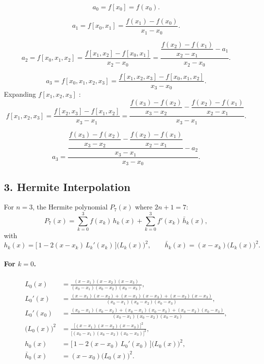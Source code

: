 \documentclass[12pt,a4paper]{article}
\begin{document}
\[
  a_0 = f[x_0] = f(x_0).
\]

\[
  a_1 = f[x_0, x_1] = \frac{f(x_1) - f(x_0)}{x_1 - x_0}.
\]

\[
  a_2 = f[x_0, x_1, x_2]
      = \frac{f[x_1, x_2] - f[x_0, x_1]}{x_2 - x_0}
      = \frac{\dfrac{f(x_2) - f(x_1)}{x_2 - x_1} - a_1}{x_2 - x_0}.
\]

\[
  a_3 = f[x_0, x_1, x_2, x_3]
      = \frac{f[x_1, x_2, x_3] - f[x_0, x_1, x_2]}{x_3 - x_0}.
\]
Expanding $f[x_1, x_2, x_3]$ :
\[
  f[x_1, x_2, x_3]
  = \frac{f[x_2, x_3] - f[x_1, x_2]}{x_3 - x_1}
  = \frac{\dfrac{f(x_3) - f(x_2)}{x_3 - x_2} - \dfrac{f(x_2) - f(x_1)}{x_2 - x_1}}{x_3 - x_1}.
\]

\[
  a_3 = \frac{\dfrac{\dfrac{f(x_3) - f(x_2)}{x_3 - x_2} - \dfrac{f(x_2) - f(x_1)}{x_2 - x_1}}{x_3 - x_1} - a_2}{x_3 - x_0}.
\]

\subsection*{3. Hermite Interpolation}
For $n = 3$, the Hermite polynomial $P_7(x)$ where $2n + 1 = 7$:
\[
  P_7(x) = \sum_{k=0}^{3} f(x_k)\, h_k(x) + \sum_{k=0}^{3} f'(x_k)\, \bar{h}_k(x),
\]
with 
\[
  h_k(x) = \bigl[\, 1 - 2(x - x_k)\, L_k'(x_k) \,\bigr] \bigl(L_k(x)\bigr)^2,
  \qquad
  \bar{h}_k(x) = (x - x_k)\bigl(L_k(x)\bigr)^2.
\]
 
\paragraph{For $k=0$.}
\begin{align*}
  L_0(x) &= \frac{(x-x_1)(x-x_2)(x-x_3)}{(x_0-x_1)(x_0-x_2)(x_0-x_3)}, \\[4pt]
  L_0'(x) &= \frac{(x-x_1)(x-x_2) + (x-x_1)(x-x_3) + (x-x_2)(x-x_3)}{(x_0-x_1)(x_0-x_2)(x_0-x_3)}, \\[4pt]
  L_0'(x_0) &= \frac{(x_0-x_1)(x_0-x_2) + (x_0-x_1)(x_0-x_3) + (x_0-x_2)(x_0-x_3)}{(x_0-x_1)(x_0-x_2)(x_0-x_3)}, \\[4pt]
  \bigl(L_0(x)\bigr)^2 &= \frac{\bigl[(x-x_1)(x-x_2)(x-x_3)\bigr]^2}{\bigl[(x_0-x_1)(x_0-x_2)(x_0-x_3)\bigr]^2}, \\[4pt]
  h_0(x) &= \bigl[\,1 - 2(x-x_0)\,L_0'(x_0)\,\bigr]\bigl(L_0(x)\bigr)^2, \\[4pt]
  \bar{h}_0(x) &= (x-x_0)\bigl(L_0(x)\bigr)^2.
\end{align*}
 
\end{document}
